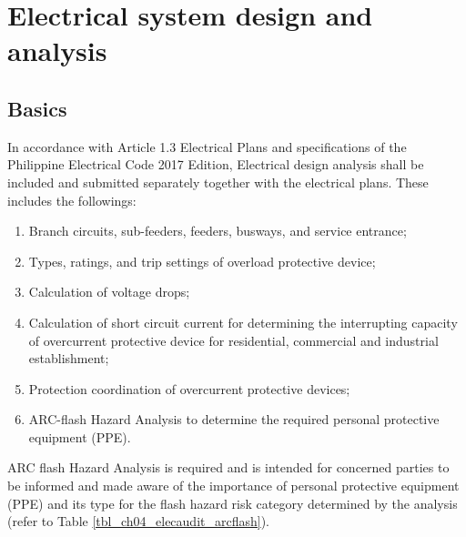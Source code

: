 \section{Electrical system design and analysis} \label{ch04_elecaudit_systemdesign}
\subsection{Basics}
In accordance with Article 1.3 Electrical Plans and specifications of the Philippine Electrical Code 2017 Edition, Electrical design analysis shall be included and submitted separately together with the electrical plans. These includes the followings:

\begin{enumerate}%
\item Branch circuits, sub-feeders, feeders, busways, and service entrance;
\item Types, ratings, and trip settings of overload protective device;
\item Calculation of voltage drops;
\item	Calculation of short circuit current for determining the interrupting capacity of overcurrent protective device for residential, commercial and industrial establishment;
\item	Protection coordination of overcurrent protective devices;
\item	ARC-flash Hazard Analysis to determine the required personal protective equipment (PPE).
\end{enumerate}

ARC flash Hazard Analysis is required and is intended for concerned parties to be informed and made aware of the importance of personal protective equipment (PPE) and its type for the flash hazard risk category determined by the analysis (refer to Table \ref{tbl_ch04_elecaudit_arcflash}).

